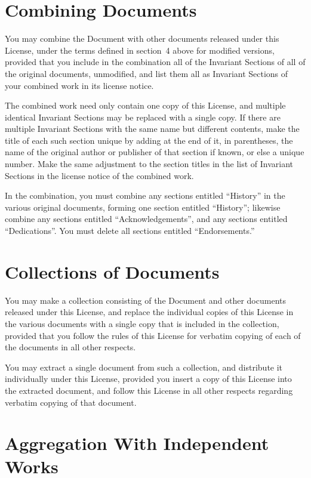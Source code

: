 \section{Combining Documents}

You may combine the Document with other documents released under this
License, under the terms defined in section~4 above for modified
versions, provided that you include in the combination all of the
Invariant Sections of all of the original documents, unmodified, and
list them all as Invariant Sections of your combined work in its
license notice.

The combined work need only contain one copy of this License, and
multiple identical Invariant Sections may be replaced with a single
copy.  If there are multiple Invariant Sections with the same name but
different contents, make the title of each such section unique by
adding at the end of it, in parentheses, the name of the original
author or publisher of that section if known, or else a unique number.
Make the same adjustment to the section titles in the list of
Invariant Sections in the license notice of the combined work.

In the combination, you must combine any sections entitled ``History''
in the various original documents, forming one section entitled
``History''; likewise combine any sections entitled ``Acknowledgements'',
and any sections entitled ``Dedications''.  You must delete all sections
entitled ``Endorsements.''


\section{Collections of Documents}

You may make a collection consisting of the Document and other documents
released under this License, and replace the individual copies of this
License in the various documents with a single copy that is included in
the collection, provided that you follow the rules of this License for
verbatim copying of each of the documents in all other respects.

You may extract a single document from such a collection, and distribute
it individually under this License, provided you insert a copy of this
License into the extracted document, and follow this License in all
other respects regarding verbatim copying of that document.



\section{Aggregation With Independent Works}


